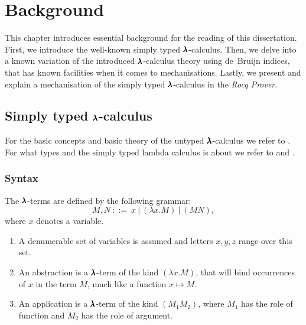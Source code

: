 \chapter{Background}
\label{c:background}


This chapter introduces essential background for the reading of this dissertation.
First, we introduce the well-known simply typed $\pmb{\lambda}$-calculus.
Then, we delve into a known variation of the introduced $\pmb{\lambda}$-calculus theory using de~Bruijn indices, that has known facilities when it comes to mechanisations.
Lastly, we present and explain a mechanisation of the simply typed $\pmb{\lambda}$-calculus in the \textit{Rocq Prover}.

\section{Simply typed $\pmb{\lambda}$-calculus}

For the basic concepts and basic theory of the untyped $\pmb{\lambda}$-calculus we refer to \cite{Barendregt1987}.
For what types and the simply typed lambda calculus is about we refer to \cite{Barendregt2013} and \cite{Hindley1997}.

\subsection{Syntax}

\begin{definition}
  The $\pmb{\lambda}$-terms are defined by the following grammar:
  \[ M, N \ ::= \ x \ | \ (\lambda x . M) \ | \ (M N) , \]
  where $x$ denotes a variable.
\end{definition}

\begin{remark} \hfill
  \begin{enumerate}
  \item A denumerable set of variables is assumed and letters $x, y, z$ range over this set.
  \item An abstraction is a $\pmb{\lambda}$-term of the kind $(\lambda x. M)$, that will bind occurrences of $x$ in the term $M$, much like a function $x \mapsto M$.
  \item An application is a $\pmb{\lambda}$-term of the kind $(M_1 M_2)$, where $M_1$ has the role of function and $M_2$ has the role of argument.
  \end{enumerate}
\end{remark}

